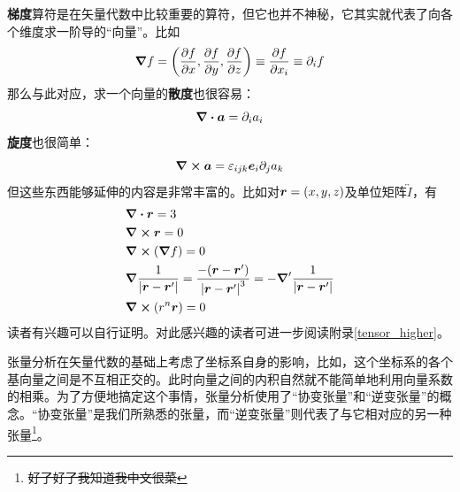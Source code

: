 \documentclass[12pt,a4paper,openany,twoside]{book}
\numberwithin{equation}{section}
\begin{document}
        \textbf{梯度}算符是在矢量代数中比较重要的算符，但它也并不神秘，它其实就代表了向各个维度求一阶导的“向量”。比如
        \begin{equation*}
          \grad{f}=\qty(\pdv{f}{x},\pdv{f}{y},\pdv{f}{z})\equiv\pdv{f}{x_i}\equiv\partial_i f
        \end{equation*} 
        那么与此对应，求一个向量的\textbf{散度}也很容易：
        \begin{equation*}
          \div{\vb*{a}}=\partial_i a_i 
        \end{equation*} 
        \textbf{旋度}也很简单：
        \begin{equation*}
          \curl{\vb*{a}}=\varepsilon_{ijk}\vb*{e}_i\partial_j a_k
        \end{equation*} 
        但这些东西能够延伸的内容是非常丰富的。比如对$\vb*{r} = (x,y,z)$及单位矩阵$\overleftrightarrow{I}$，有
        \begin{align}
          &\div{\vb*{r}}=3 \\
          &\curl{\vb*{r}}=0 \\
          &\curl{(\grad{f})}=0 \\
          &\grad{\frac{1}{\abs{\vb*{r}-\vb*{r}'}}}=\frac{-\qty(\vb*{r}-\vb*{r}')}{\abs{\vb*{r}-\vb*{r}'}^3}=-\grad'{\frac{1}{\abs{\vb*{r}-\vb*{r}'}}} \\
          &\curl{\qty(r^n \vb*{r})}=0 
        \end{align}
        读者有兴趣可以自行证明。对此感兴趣的读者可进一步阅读附录\ref{tensor_higher}。\\

        {}

        张量分析在矢量代数的基础上考虑了坐标系自身的影响，比如，这个坐标系的各个基向量之间是不互相正交的。此时向量之间的内积自然就不能简单地利用向量系数的相乘。为了方便地搞定这个事情，张量分析使用了“协变张量”和“逆变张量”的概念。“协变张量”是我们所熟悉的张量，而“逆变张量”则代表了与它相对应的另一种张量\footnote{\sout{好了好了我知道我中文很菜}}。
\end{document}
